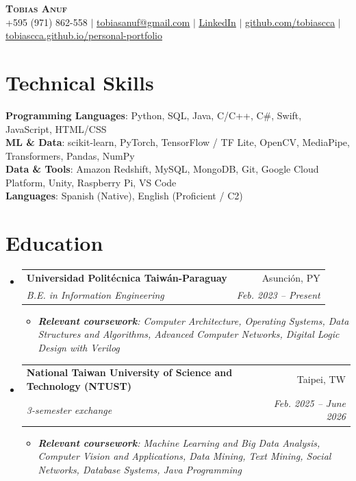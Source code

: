 \documentclass[letterpaper,11pt]{article}
\makeatletter
\newcommand{\resumeItem}[1]{
  \item\small{
    {#1 \vspace{-2pt}}
  }
}
\newcommand{\resumeSubheading}[4]{
  \vspace{-2pt}\item
    \begin{tabular*}{0.97\textwidth}[t]{l@{\extracolsep{\fill}}r}
      \textbf{#1} & #2 \\
      \textit{\small#3} & \textit{\small #4} \\
    \end{tabular*}\vspace{-7pt}
}
\newcommand{\resumeSubHeadingListStart}{\begin{itemize}[leftmargin=0.15in, label={}]}
\newcommand{\resumeSubHeadingListEnd}{\end{itemize}}
\newcommand{\resumeItemListStart}{\begin{itemize}}
\newcommand{\resumeItemListEnd}{\end{itemize}\vspace{-5pt}}
\makeatother
\begin{document}
\begin{center}
    \textbf{\Huge \scshape Tobias Anuf} \\ \vspace{1pt}
    \small +595 (971) 862-558 $|$
    \href{mailto:tobiasanuf@gmail.com}{\underline{tobiasanuf@gmail.com}} $|$
    \href{https://www.linkedin.com/in/tobias-anuf-0003942b2}{\underline{LinkedIn}} $|$
    \href{https://github.com/tobiascca}{\underline{github.com/tobiascca}} $|$
    \href{https://tobiascca.github.io/personal-portfolio/}{\underline{tobiascca.github.io/personal-portfolio}}
\end{center}

\section{Technical Skills}
 \begin{itemize}[leftmargin=0.15in, label={}]
    \small{\item{
     \textbf{Programming Languages}{: Python, SQL, Java, C/C++, C\#, Swift, JavaScript, HTML/CSS} \\
     \textbf{ML \& Data}{: scikit-learn, PyTorch, TensorFlow / TF Lite, OpenCV, MediaPipe, Transformers, Pandas, NumPy} \\
     \textbf{Data \& Tools}{: Amazon Redshift, MySQL, MongoDB, Git, Google Cloud Platform, Unity, Raspberry Pi, VS Code} \\
     \textbf{Languages}{: Spanish (Native), English (Proficient / C2)}
    }}
 \end{itemize}

\section{Education}
  \resumeSubHeadingListStart
    \resumeSubheading
      {Universidad Politécnica Taiwán-Paraguay}{Asunción, PY}
      {B.E. in Information Engineering}{Feb. 2023 -- Present}
      \resumeItemListStart
        \resumeItem{\textit{\textbf{Relevant coursework}: Computer Architecture, Operating Systems, Data Structures and Algorithms, Advanced Computer Networks, Digital Logic Design with Verilog}}
      \resumeItemListEnd
    \resumeSubheading
      {National Taiwan University of Science and Technology (NTUST)}{Taipei, TW}
      {3-semester exchange}{Feb. 2025 -- June 2026}
      \resumeItemListStart
        \resumeItem{\textit{\textbf{Relevant coursework}: Machine Learning and Big Data Analysis, Computer Vision and Applications, Data Mining, Text Mining, Social Networks, Database Systems, Java Programming}}
      \resumeItemListEnd
  \resumeSubHeadingListEnd
\end{document}

